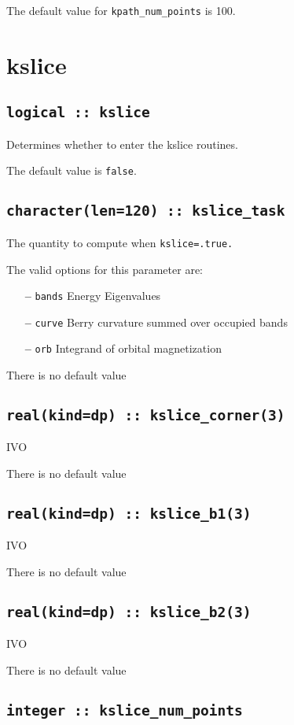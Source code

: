 The default value for \verb#kpath_num_points# is 100.




\clearpage
\section{kslice}

\subsection[berry]{\tt logical :: kslice}
Determines whether to enter the kslice routines.

The default value is \verb#false#.

\subsection[kslice\_task]{\tt character(len=120) ::  kslice\_task}
The quantity to compute when {\tt kslice=.true.} 

The valid options for this parameter are:
\begin{itemize}
\item[{\bf --}]  \verb#bands# Energy Eigenvalues
\item[{\bf --}]  \verb#curve# Berry curvature summed over occupied bands
\item[{\bf --}] \verb#orb#  Integrand of orbital magnetization
\end{itemize}
There is no default value

\subsection[kslice\_corner]{\tt real(kind=dp) :: kslice\_corner(3)}
IVO

There is no default value

\subsection[kslice\_corner]{\tt real(kind=dp) :: kslice\_b1(3)}
IVO

There is no default value

\subsection[kslice\_corner]{\tt real(kind=dp) :: kslice\_b2(3)}
IVO

There is no default value

\subsection[kslice\_num\_points]{\tt integer :: kslice\_num\_points}

